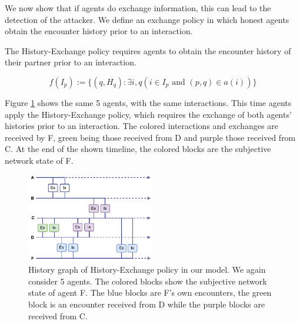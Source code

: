 We now show that if agents do exchange information, this can lead to the detection of the attacker. We
define an exchange policy in which honest agents obtain the encounter history prior to an interaction.

\begin{pol}
    \label{pol:one}
    The History-Exchange policy requires agents to obtain the encounter history of their partner 
    prior to an interaction. 

    \[ f(I_p) := \{ (q, H_q) : \exists i, q (i \in I_p \text{ and } (p, q) \in a(i)) \}\]
\end{pol}

Figure \ref{fig:chain_exchange} shows the same 5 agents, with the same interactions. This time agents
apply the History-Exchange policy, which requires the exchange of both agents' histories prior to 
an interaction. The colored interactions and exchanges are received by F, green being those received
from D and purple those received from C. At the end of the shown timeline, the colored blocks are 
the subjective network state of F.

\begin{figure}
    \centering
    \includegraphics[width=0.5\textwidth]{images/chain_exchange.pdf}
    \caption{History graph of History-Exchange policy in our model. We again consider 5 agents. The 
    colored blocks show the subjective network state of agent F. The blue blocks are F's own encounters,
    the green block is an encounter received from D while the purple blocks are received from C.}
    \label{fig:chain_exchange}
\end{figure}

